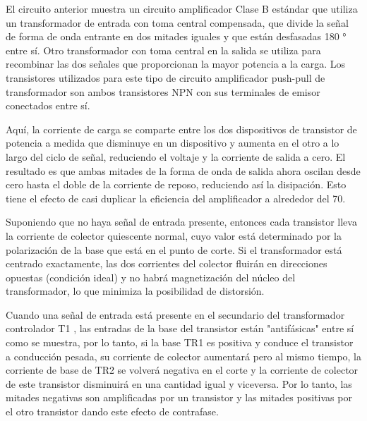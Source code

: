 \documentclass[12pt,a4paper]{article}
\begin{document}
\begin{flushleft}
El circuito anterior muestra un circuito amplificador Clase B estándar que utiliza un transformador de entrada con toma central compensada, que divide la señal de forma de onda entrante en dos mitades iguales y que están desfasadas 180 ° entre sí. Otro transformador con toma central en la salida se utiliza para recombinar las dos señales que proporcionan la mayor potencia a la carga. Los transistores utilizados para este tipo de circuito amplificador push-pull de transformador son ambos transistores NPN con sus terminales de emisor conectados entre sí.\linebreak

Aquí, la corriente de carga se comparte entre los dos dispositivos de transistor de potencia a medida que disminuye en un dispositivo y aumenta en el otro a lo largo del ciclo de señal, reduciendo el voltaje y la corriente de salida a cero. El resultado es que ambas mitades de la forma de onda de salida ahora oscilan desde cero hasta el doble de la corriente de reposo, reduciendo así la disipación. Esto tiene el efecto de casi duplicar la eficiencia del amplificador a alrededor del 70.\linebreak

Suponiendo que no haya señal de entrada presente, entonces cada transistor lleva la corriente de colector quiescente normal, cuyo valor está determinado por la polarización de la base que está en el punto de corte. Si el transformador está centrado exactamente, las dos corrientes del colector fluirán en direcciones opuestas (condición ideal) y no habrá magnetización del núcleo del transformador, lo que minimiza la posibilidad de distorsión.\linebreak

Cuando una señal de entrada está presente en el secundario del transformador controlador T1 , las entradas de la base del transistor están "antifásicas" entre sí como se muestra, por lo tanto, si la base TR1 es positiva y conduce el transistor a conducción pesada, su corriente de colector aumentará pero al mismo tiempo, la corriente de base de TR2 se volverá negativa en el corte y la corriente de colector de este transistor disminuirá en una cantidad igual y viceversa. Por lo tanto, las mitades negativas son amplificadas por un transistor y las mitades positivas por el otro transistor dando este efecto de contrafase.
\linebreak
\end{flushleft}
\end{document}
